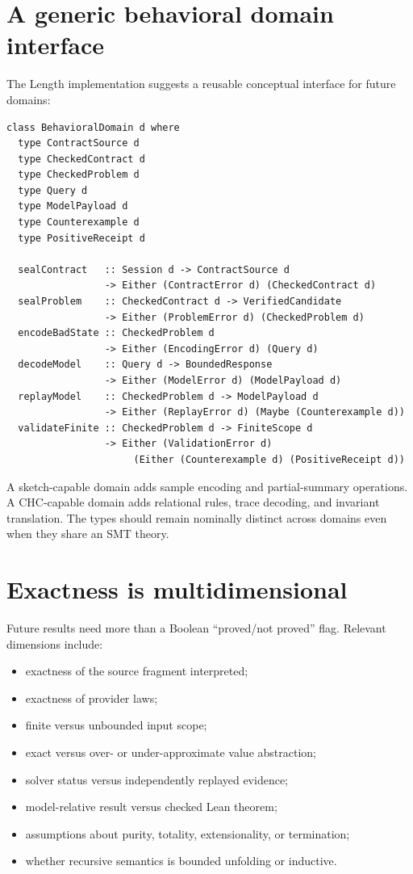 \documentclass[10pt,letterpaper,oneside]{report}
\begin{document}
\section{A generic behavioral domain interface}

The Length implementation suggests a reusable conceptual interface for future domains:

\begin{lstlisting}[language=HaskellX,caption={Conceptual domain responsibilities, not a current public API.}]
class BehavioralDomain d where
  type ContractSource d
  type CheckedContract d
  type CheckedProblem d
  type Query d
  type ModelPayload d
  type Counterexample d
  type PositiveReceipt d

  sealContract   :: Session d -> ContractSource d
                 -> Either (ContractError d) (CheckedContract d)
  sealProblem    :: CheckedContract d -> VerifiedCandidate
                 -> Either (ProblemError d) (CheckedProblem d)
  encodeBadState :: CheckedProblem d
                 -> Either (EncodingError d) (Query d)
  decodeModel    :: Query d -> BoundedResponse
                 -> Either (ModelError d) (ModelPayload d)
  replayModel    :: CheckedProblem d -> ModelPayload d
                 -> Either (ReplayError d) (Maybe (Counterexample d))
  validateFinite :: CheckedProblem d -> FiniteScope d
                 -> Either (ValidationError d)
                      (Either (Counterexample d) (PositiveReceipt d))
\end{lstlisting}

A sketch-capable domain adds sample encoding and partial-summary operations. A CHC-capable domain adds relational rules, trace decoding, and invariant translation. The types should remain nominally distinct across domains even when they share an SMT theory.

\section{Exactness is multidimensional}

Future results need more than a Boolean ``proved/not proved'' flag. Relevant dimensions include:

\begin{itemize}
\item exactness of the source fragment interpreted;
\item exactness of provider laws;
\item finite versus unbounded input scope;
\item exact versus over- or under-approximate value abstraction;
\item solver status versus independently replayed evidence;
\item model-relative result versus checked Lean theorem;
\item assumptions about purity, totality, extensionality, or termination;
\item whether recursive semantics is bounded unfolding or inductive.
\end{itemize}
\end{document}
